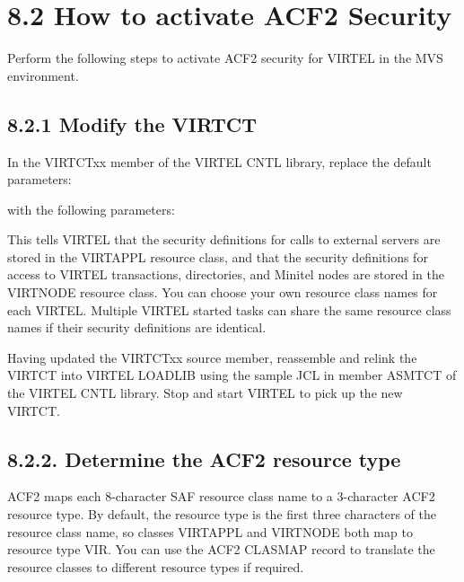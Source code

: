 \documentclass[letterpaper,10pt,english]{sphinxmanual}
\begin{document}
\section{8.2 How to activate ACF2 Security}
\label{\detokenize{Installation_Guide:how-to-activate-acf2-security}}
Perform the following steps to activate ACF2 security for VIRTEL in the MVS environment.


\subsection{8.2.1 Modify the VIRTCT}
\label{\detokenize{Installation_Guide:id9}}
In the VIRTCTxx member of the VIRTEL CNTL library, replace the default parameters:

\begin{sphinxVerbatim}[commandchars=\\\{\}]
\end{sphinxVerbatim}

with the following parameters:

\begin{sphinxVerbatim}[commandchars=\\\{\}]
\end{sphinxVerbatim}

This tells VIRTEL that the security definitions for calls to external servers are stored in the VIRTAPPL resource class, and that the security definitions for access to VIRTEL transactions, directories, and Minitel nodes are stored in the VIRTNODE resource class. You can choose your own resource class names for each VIRTEL. Multiple VIRTEL started tasks can share the same resource class names if their security definitions are identical.

Having updated the VIRTCTxx source member, reassemble and relink the VIRTCT into VIRTEL LOADLIB using the sample JCL in member ASMTCT of the VIRTEL CNTL library. Stop and start VIRTEL to pick up the new VIRTCT.


\subsection{8.2.2. Determine the ACF2 resource type}
\label{\detokenize{Installation_Guide:determine-the-acf2-resource-type}}
ACF2 maps each 8-character SAF resource class name to a 3-character ACF2 resource type. By default, the resource type is the first three characters of the resource class name, so classes VIRTAPPL and VIRTNODE both map to resource type VIR. You can use the ACF2 CLASMAP record to translate the resource classes to different resource types if required.
\end{document}
